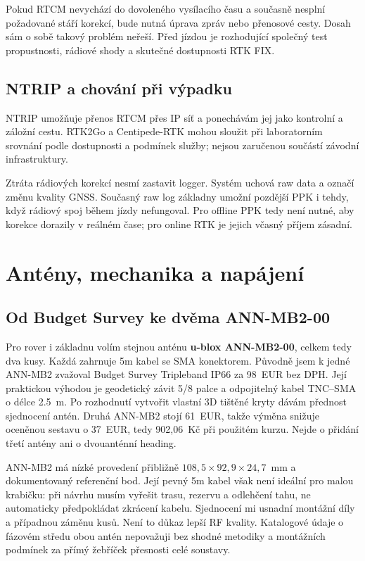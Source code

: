 Pokud RTCM nevychází do dovoleného vysílacího času a současně nesplní
požadované stáří korekcí, bude nutná úprava zpráv nebo přenosové cesty.
Dosah sám o sobě takový problém neřeší. Před jízdou je rozhodující
společný test propustnosti, rádiové shody a skutečné dostupnosti RTK FIX.

\subsection{NTRIP a chování při výpadku}

NTRIP umožňuje přenos RTCM přes IP síť a ponechávám jej jako kontrolní
a záložní cestu.\cite{bkg-ntrip}
RTK2Go a Centipede-RTK mohou sloužit při laboratorním srovnání podle
dostupnosti a podmínek služby; nejsou zaručenou součástí závodní
infrastruktury.\cite{rtk2go,centipede}

Ztráta rádiových korekcí nesmí zastavit logger. Systém uchová raw data
a označí změnu kvality GNSS. Současný raw log základny umožní pozdější
PPK i tehdy, když rádiový spoj během jízdy nefungoval. Pro offline PPK
tedy není nutné, aby korekce dorazily v reálném čase; pro online RTK je
jejich včasný příjem zásadní.

\section{Antény, mechanika a napájení}

\subsection{Od Budget Survey ke dvěma ANN-MB2-00}

Pro rover i základnu volím stejnou anténu \textbf{u-blox ANN-MB2-00},
celkem tedy dva kusy. Každá zahrnuje 5m kabel se SMA konektorem.
\cite{ardusimple-annmb2}
Původně jsem k jedné ANN-MB2 zvažoval Budget Survey Tripleband IP66 za
98~EUR bez DPH. Její praktickou výhodou je geodetický závit 5/8 palce
a odpojitelný kabel TNC--SMA o délce \SI{2.5}{m}.
\cite{ardusimple-budget-survey}
Po rozhodnutí vytvořit vlastní 3D tištěné kryty dávám přednost
sjednocení antén. Druhá ANN-MB2 stojí 61~EUR, takže výměna snižuje
oceněnou sestavu o 37~EUR, tedy 902,06~Kč při použitém kurzu.
Nejde o přidání třetí antény ani o dvouanténní heading.

ANN-MB2 má nízké provedení přibližně
$108{,}5\times92{,}9\times24{,}7$~mm a dokumentovaný referenční bod.
Její pevný 5m kabel však není ideální pro malou krabičku: při návrhu
musím vyřešit trasu, rezervu a odlehčení tahu, ne automaticky předpokládat
zkrácení kabelu.\cite{ublox-annmb2-ds}
Sjednocení mi usnadní montážní díly a případnou záměnu kusů. Není to
důkaz lepší RF kvality. Katalogové údaje o fázovém středu obou antén
nepovažuji bez shodné metodiky a montážních podmínek za přímý žebříček
přesnosti celé soustavy.

